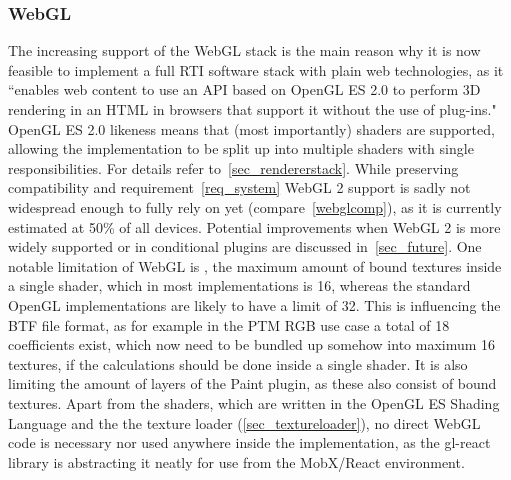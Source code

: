 \subsubsection*{WebGL}
The increasing support of the WebGL stack is the main reason why
  it is now feasible to implement a full RTI software stack with plain web
  technologies, as it ``enables web content to use an API based on OpenGL ES 2.0
  to perform 3D rendering in an HTML  in browsers that support it
  without the use of plug-ins."\cite*{noauthor_webgl_nodate-1} OpenGL ES 2.0
  likeness means that (most importantly) shaders are supported, allowing the
  implementation to be split up into multiple shaders with single
  responsibilities. For details refer to~\autoref{sec_rendererstack}. While preserving compatibility and
  requirement~\ref{req_system} WebGL 2 support is sadly not widespread enough to fully rely on yet
  (compare~\autoref{webglcomp}), as it is currently estimated at 50\% of all devices\cite*{noauthor_webgl_nodate-2}.
    Potential improvements
  when WebGL 2 is more widely supported or in conditional plugins are discussed
  in~\autoref{sec_future}. One notable limitation of WebGL is
  , the maximum amount of bound textures inside a
  single shader, which in most implementations is
  16\cite*{noauthor_webgl_nodate-3}, whereas the standard OpenGL implementations
  are likely to have a limit of 32. This is influencing the BTF file format, as
  for example in the PTM RGB use case a total of 18 coefficients exist, which
  now need to be bundled up somehow into maximum 16 textures, if the
  calculations should be done inside a single shader. It is also limiting the
  amount of layers of the Paint plugin, as these also consist of bound textures.
  Apart from the shaders, which are written in the OpenGL ES
  Shading Language\cite*{noauthor_webgl_nodate-4} and the the texture loader (\autoref{sec_textureloader}), no direct
  WebGL code is necessary nor used anywhere inside the implementation, as the
  gl-react library is abstracting it neatly for use from the MobX/React environment.


